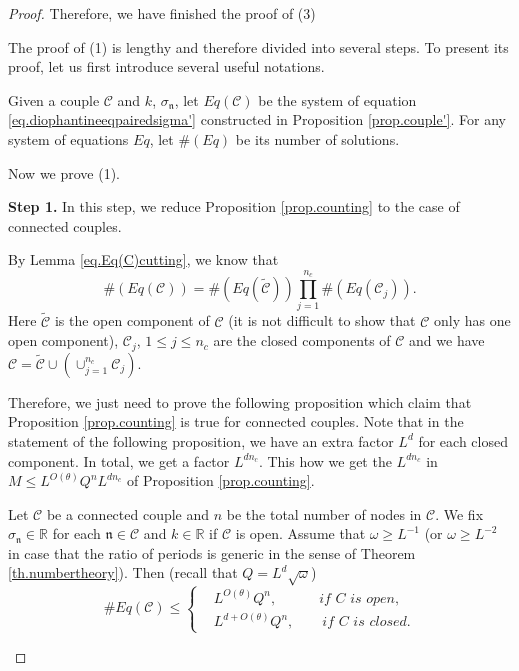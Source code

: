 \begin{proof}
Therefore, we have finished the proof of (3)

The proof of (1) is lengthy and therefore divided into several steps. To present its proof, let us first introduce several useful notations.

Given a couple $\mathcal{C}$ and $k$, $\sigma_{\mathfrak{n}}$, let $Eq(\mathcal{C})$ be the system of equation \eqref{eq.diophantineeqpairedsigma'} constructed in Proposition \ref{prop.couple'}. For any system of equations $Eq$, let $\#(Eq)$ be its number of solutions.

Now we prove (1).

\textbf{Step 1.} In this step, we reduce Proposition \ref{prop.counting} to the case of connected couples.

By Lemma \eqref{eq.Eq(C)cutting}, we know that 
\begin{equation}\label{eq.conn}
    \#(Eq(\mathcal{C}))= \#(Eq(\widetilde{\mathcal{C}}))\prod_{j=1}^{n_c} \#(Eq(\mathcal{C}_{j})).
\end{equation}
Here $\widetilde{\mathcal{C}}$ is the open component of $\mathcal{C}$ (it is not difficult to show that $\mathcal{C}$ only has one open component), $\mathcal{C}_{j}$, $1\le j\le n_c$ are the closed components of $\mathcal{C}$ and we have $\mathcal{C}=\widetilde{\mathcal{C}}\cup(\cup_{j=1}^{n_c} \mathcal{C}_{j})$.

Therefore, we just need to prove the following proposition which claim that Proposition \ref{prop.counting} is true for connected couples. Note that in the statement of the following proposition, we have an extra factor $L^d$ for each closed component. In total, we get a factor $L^{dn_c}$. This how we get the $L^{dn_c}$ in $M\leq L^{O(\theta)} Q^{n} L^{dn_c}$ of Proposition \ref{prop.counting}.


\begin{prop}\label{prop.countingconn} Let $\mathcal{C}$ be a connected couple and $n$ be the total number of nodes in $\mathcal{C}$. We fix $\sigma_{\mathfrak{n}}\in\mathbb{R}$ for each $\mathfrak{n}\in \mathcal{C}$ and $k\in \mathbb{R}$ if $\mathcal{C}$ is open. Assume that $\omega\ge L^{-1}$ (or $\omega\ge L^{-2}$ in case that the ratio of periods is generic in the sense of Theorem \ref{th.numbertheory}). Then (recall that $Q=L^{d}\sqrt{\omega}$)
\begin{equation}\label{eq.countingbd2}\# Eq(\mathcal{C})\leq\left\{\begin{aligned}
&L^{O(\theta)} Q^{n},     \qquad\quad\textit{if $C$ is open},\\
& L^{d+O(\theta) }Q^{n},\qquad\textit{if $C$ is closed}.
\end{aligned}
\right.
\end{equation}
\end{prop}


\end{proof}
